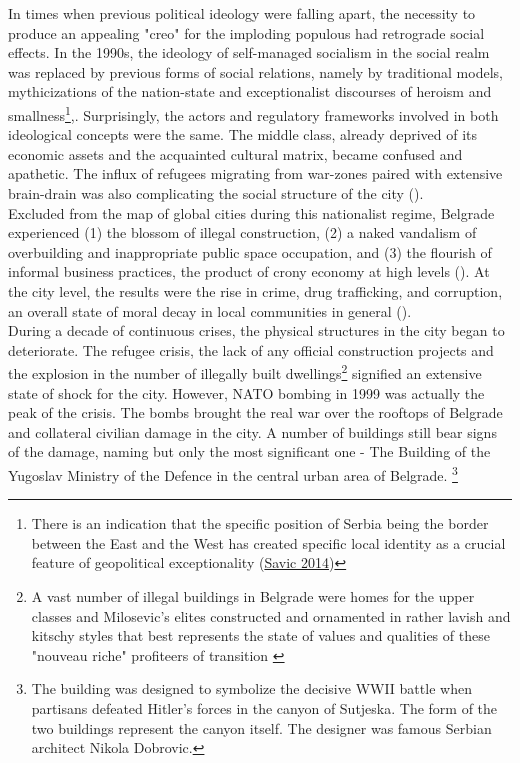 \documentclass[11pt]{report}
\begin{document}
In times when previous political ideology were falling apart, the necessity to produce an appealing "creo" for the imploding populous had retrograde social effects.
In the 1990s, the ideology of self-managed socialism in the social realm was replaced by previous forms of social relations, namely by traditional models, mythicizations of the nation-state and exceptionalist discourses of heroism and smallness\footnote{There is an indication that the specific position of Serbia being the border between the East and the West has created specific local identity as a crucial feature of geopolitical exceptionality (\href{ref}{Savic 2014})}{\citealt{savic_where_2014}},\href{ref}{\citealt{doytchinov_belgrade_2015}}. 
Surprisingly, the actors and regulatory frameworks involved in both ideological concepts were the same.
The middle class, already deprived of its economic assets and the acquainted cultural matrix, became confused and apathetic.
The influx of refugees migrating from war-zones paired with extensive brain-drain was also complicating the social structure of the city (\href{ref}{\citealt{doytchinov_urban_2015}}).
\\

Excluded from the map of global cities during this nationalist regime, Belgrade experienced (1) the blossom of illegal construction, (2) a naked vandalism of overbuilding and inappropriate public space occupation, and (3) the flourish of informal business practices, the product of crony economy at high levels (\cite{ref}).
At the city level, the results were the rise in crime, drug trafficking, and corruption, an overall state of moral decay in local communities in general (\cite{Prodanovic Stariji i lepsi Beograd}).
\\
During a decade of continuous crises, the physical structures in the city began to deteriorate.
The refugee crisis, the lack of any official construction projects and the explosion in the number of illegally built dwellings\footnote{A vast number of illegal buildings in Belgrade were homes for the upper classes and Milosevic's elites constructed and ornamented in rather lavish and kitschy styles that best represents the state of values and qualities of these "nouveau riche" profiteers of transition \href{ref}{\citealt{hirt_belgrade_2009}}}
signified an extensive state of shock for the city.
However, NATO bombing in 1999 was actually the peak of the crisis. The bombs brought the real war over the rooftops of Belgrade and collateral civilian damage in the city.
A number of buildings still bear signs of the damage, naming but only the most significant one - The Building of the Yugoslav Ministry of the Defence in the central urban area of Belgrade.
\footnote{The building was designed to symbolize the decisive WWII battle when partisans defeated Hitler's forces in the canyon of Sutjeska. The form of the two buildings represent the canyon itself. The designer was famous Serbian architect Nikola Dobrovic.}
\\
\end{document}
